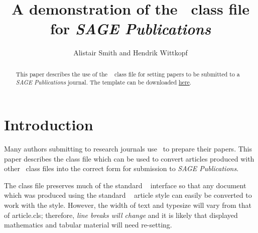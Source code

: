 \documentclass[Afour,sageh,times]{includes/tex/sagej}
\begin{document}

\newcommand\BibTeX{{\rmfamily B\kern-.05em \textsc{i\kern-.025em b}\kern-.08em
T\kern-.1667em\lower.7ex\hbox{E}\kern-.125emX}}

\def\volumeyear{2016}



\title{A demonstration of the \LaTeXe\ class file for
\itshape{SAGE Publications}}

\author{Alistair Smith and Hendrik Wittkopf}




\begin{abstract}
This paper describes the use of the \LaTeXe\
\textsf{\journalclass} class file for setting papers to be
submitted to a \textit{SAGE Publications} journal.
The template can be downloaded \href{http://www.uk.sagepub.com/repository/binaries/SAGE LaTeX template.zip}{here}.
\end{abstract}


\maketitle


\section{Introduction}

Many authors submitting to research journals use \LaTeXe~to prepare
their papers. This paper describes the \textsf{\journalclass} class file
which can be used to convert articles produced with other \LaTeXe~class
files into the correct form for submission to
\textit{SAGE Publications}.

The \textsf{\journalclass} class file preserves much of the standard
\LaTeXe~ interface so that any document which was produced using the
standard \LaTeXe~ \textsf{article} style can easily be converted to work
with the \textsf{\journalclassshort} style. However, the width of text
and typesize will vary from that of \textsf{article.cls}; therefore,
\textit{line breaks 
will change} and it is likely that displayed mathematics and tabular
material will need re-setting.
\end{document}
